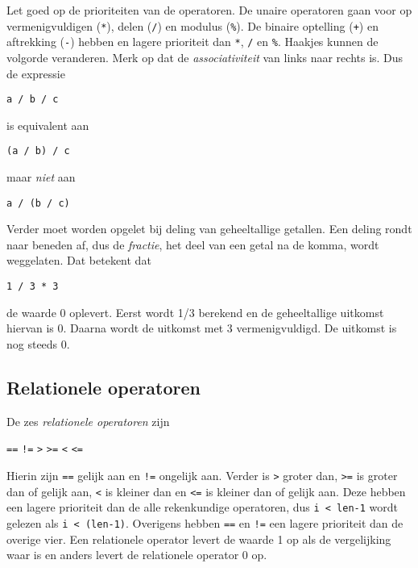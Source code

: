 Let goed op de prioriteiten van de operatoren. De unaire operatoren gaan voor op vermenigvuldigen (\texttt{*}), delen (\texttt{/}) en modulus (\texttt{\%}). De binaire optelling (\texttt{+}) en aftrekking (\texttt{-}) hebben en lagere prioriteit dan \texttt{*}, \texttt{/} en \texttt{\%}. Haakjes kunnen de volgorde veranderen. Merk op dat de \textsl{associativiteit} van links naar rechts is. Dus de expressie

\hspace*{1em}\texttt{a / b / c}

is equivalent aan

\hspace*{1em}\texttt{(a / b) / c}
 
maar \textsl{niet} aan

\hspace*{1em}\texttt{a / (b / c)}

Verder moet worden opgelet bij deling van geheeltallige getallen. Een deling rondt naar beneden af, dus de \textsl{fractie}, het deel van een getal na de komma, wordt weggelaten. Dat betekent dat

\hspace*{1em}\texttt{1 / 3 * 3}

de waarde 0 oplevert. Eerst wordt 1/3 berekend en de geheeltallige uitkomst hiervan is 0. Daarna wordt de uitkomst met 3 vermenigvuldigd. De uitkomst is nog steeds 0.

\subsection{Relationele operatoren}
De zes \textsl{relationele operatoren} zijn

\hspace*{1em}\texttt{==} \quad \texttt{!=} \quad \texttt{>} \quad \texttt{>=} \quad \texttt{<} \quad \texttt{<=}

\indexop{==}\indexop{>}\indexop{>=}\indexop{<}\indexop{<=}
Hierin zijn \texttt{==} gelijk aan en \texttt{!=} ongelijk aan. Verder is \texttt{>} groter dan, \texttt{>=} is groter dan of gelijk aan, \texttt{<} is kleiner dan en \texttt{<=} is kleiner dan of gelijk aan. Deze hebben een lagere prioriteit dan de alle rekenkundige operatoren, dus \texttt{i < len-1} wordt gelezen als \texttt{i < (len-1)}. Overigens hebben \texttt{==} en \texttt{!=} een lagere prioriteit dan de overige vier. Een relationele operator levert de waarde 1 op als de vergelijking waar is en anders levert de relationele operator 0 op.

